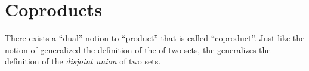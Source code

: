 
\section{Coproducts}
\label{sec:coproducts}


There exists a ``dual'' notion to ``product'' that is called ``coproduct''.
Just like the notion of  generalized the definition of the  of two sets, the  generalizes the definition of the \emph{disjoint union} of two sets.
%
%
%

